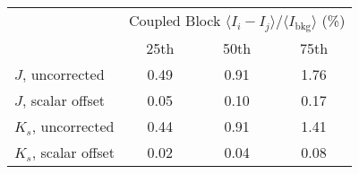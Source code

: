 \begin{tabular}{lccc}
& \multicolumn{3}{c}{Coupled Block
$\langle I_i - I_j\rangle / \langle I_\mathrm{bkg} \rangle$ (\%)} \\
& 25th & 50th & 75th \\
\hline
$J$, uncorrected & 0.49 & 0.91 & 1.76 \\
$J$, scalar offset & 0.05 & 0.10 & 0.17 \\
\hline
$K_s$, uncorrected & 0.44 & 0.91 & 1.41 \\
$K_s$, scalar offset & 0.02 & 0.04 & 0.08 \\
\hline
\end{tabular}
